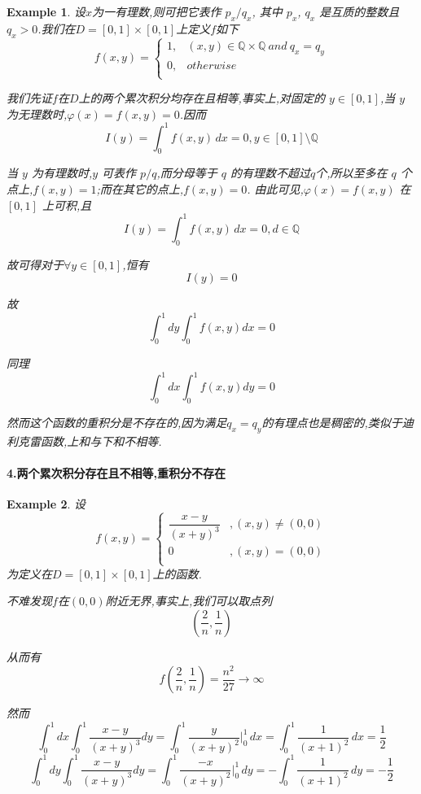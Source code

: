 \documentclass[11pt,hyperref,a4paper,UTF8]{ctexart}
\newtheorem{example}{Example}[subsection]
\newcommand{\QQ}{\mathbb{Q}}
\newcommand{\parameter}[1]{\left(#1\right)}
\begin{document}
\begin{CJK}{UTF8}{gkai}
\begin{example}
  设$x$为一有理数,则可把它表作 $p_x / q_x$, 其中 $p_x$, $q_x$ 是互质的整数且 $q_x > 0$.我们在$D = [0 , 1] \times [0 , 1]$上定义$f$如下
  \[f(x,y) = \begin{cases}
    1, &(x,y) \in \QQ \times \QQ ~and~ q_x = q_y\\
    0, &otherwise\\
  \end{cases}\]

  我们先证$f$在$D$上的两个累次积分均存在且相等,事实上,对固定的 $y \in [0,1]$,当 $y$ 为无理数时,$\varphi(x) = f(x,y) = 0$.因而 
  \[I(y) = \int_{0}^{1}f(x,y)\, dx = 0, y \in [0,1] \setminus \QQ\]

  当 $y$ 为有理数时,$y$ 可表作 $p/q$,而分母等于 $q$ 的有理数不超过$q$个,所以至多在 $q$ 个点上,$f(x,y) = 1$;而在其它的点上,$f(x,y) = 0$. 由此可见,$\varphi(x) = f(x,y)$ 在 $[0,1]$ 上可积,且
  \[I(y) = \int_{0}^{1} f(x,y)\, dx = 0, d \in \QQ\]

  故可得对于$\forall y \in [0,1]$,恒有
  \[I(y) = 0\]

  故
  \[\int_{0}^{1} dy \int_{0}^{1} f(x,y)dx = 0\]

  同理
  \[\int_{0}^{1} dx \int_{0}^{1} f(x,y)dy = 0\]

  然而这个函数的重积分是不存在的,因为满足$q_x = q_y$的有理点也是稠密的,类似于迪利克雷函数,上和与下和不相等.
\end{example}

\paragraph{4.两个累次积分存在且不相等,重积分不存在}
\begin{example}

  设
  \[f(x,y) = \begin{cases}
    \dfrac{x - y}{(x + y)^3}&, (x,y) \neq (0,0)\\
    0&,(x,y) = (0,0)\\
  \end{cases}\]
  为定义在$D = [0 , 1] \times [0 , 1]$上的函数.

  不难发现$f$在$(0,0)$附近无界,事实上,我们可以取点列
  \[\parameter{\frac{2}{n},\frac{1}{n}}\]

  从而有
  \[f\parameter{\frac{2}{n},\frac{1}{n}} = \frac{n^2}{27} \to \infty\]

  然而
  \[\int_{0}^{1} dx \int_{0}^{1} \frac{x - y}{(x + y)^3} dy = \int_{0}^{1} \frac{y}{(x + y)^2}\bigg|_0^1 \, dx  = \int_{0}^{1} \frac{1}{(x + 1)^2}\, dx = \frac{1}{2}\]
  \[\int_{0}^{1} dy \int_{0}^{1} \frac{x - y}{(x + y)^3} dy = \int_{0}^{1} \frac{-x}{(x + y)^2}\bigg|_0^1 \, dy  = -\int_{0}^{1} \frac{1}{(x + 1)^2}\, dy = -\frac{1}{2}\]
\end{example}


\end{CJK}
\end{document}
